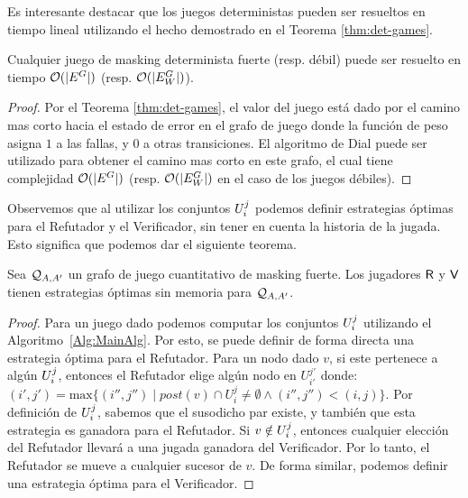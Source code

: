 Es interesante destacar que los juegos deterministas pueden ser resueltos en tiempo lineal utilizando el hecho demostrado en el Teorema \ref{thm:det-games}.
\begin{theorem}\label{thm:deterministic-qgame-complexity} 
Cualquier juego de masking determinista fuerte (resp. débil) puede ser resuelto en tiempo $\mathcal{O}(|E^G|)$ (resp. $\mathcal{O}(|E_W^G|)$).
\end{theorem}
\begin{proof} Por el Teorema \ref{thm:det-games}, el valor del juego está dado por el camino mas corto hacia el estado de error en el grafo de juego donde la función de peso asigna $1$ a las fallas, y $0$ a otras transiciones. El algoritmo de Dial \cite{Dial69} puede ser utilizado para obtener el camino mas corto en este grafo, el cual tiene complejidad $\mathcal{O}(|E^G|)$  (resp. $\mathcal{O}(|E^G_W|)$ en el caso de los juegos débiles).
\qedhere
\end{proof} 

Observemos que al utilizar los conjuntos $U^j_i$ podemos definir estrategias óptimas para el Refutador y el Verificador, sin tener en cuenta la historia de la jugada. Esto significa que podemos dar el siguiente teorema.
 
\begin{theorem} \label{thm:memoryless} Sea $\mathcal{Q}_{A, A'}$ un grafo de juego cuantitativo de masking fuerte.
  Los jugadores $\mathsf{R}$ y $\mathsf{V}$ tienen estrategias óptimas sin memoria para $\mathcal{Q}_{A, A'}$.
\end{theorem}
\begin{proof} Para un juego dado podemos computar los conjuntos $U^j_i$ utilizando el Algoritmo~\ref{Alg:MainAlg}.
Por esto, se puede definir de forma directa una estrategia óptima para el Refutador. 
Para un nodo dado $v$, si este pertenece a algún $U^j_i$, entonces el Refutador elige algún nodo en $U^{j'}_{i'}$ donde: 
$(i', j') = \text{max}\{(i'', j'') \mid post(v) \cap U^{j}_{i} \neq \emptyset \wedge (i'',j'') < (i,j) \}$. 
Por definición de $U^j_i$, sabemos que el susodicho par existe, y también que esta estrategia es ganadora para el Refutador. Si $v \notin U^j_i$, entonces cualquier elección del Refutador llevará a una jugada ganadora del Verificador. 
Por lo tanto, el Refutador se mueve a cualquier sucesor de $v$.
De forma similar, podemos definir una estrategia óptima para el Verificador.
\qedhere 
\end{proof} \\



